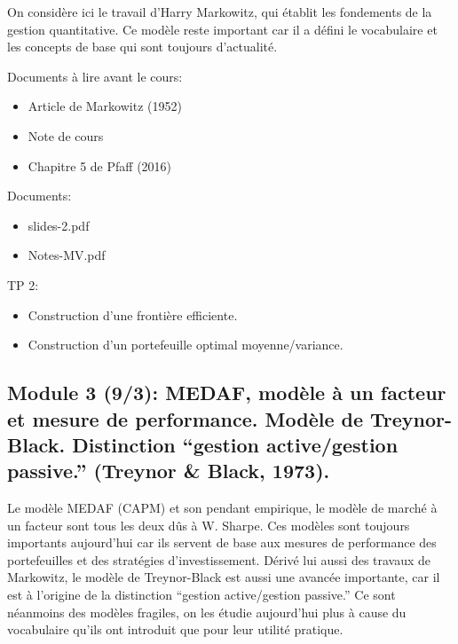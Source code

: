 \documentclass[
  11pt,
]{article}
\providecommand{\tightlist}{%
  \setlength{\itemsep}{0pt}\setlength{\parskip}{0pt}}
\begin{document}
On considère ici le travail d'Harry Markowitz, qui établit les
fondements de la gestion quantitative. Ce modèle reste important car il
a défini le vocabulaire et les concepts de base qui sont toujours
d'actualité.

Documents à lire avant le cours:

\begin{itemize}
\tightlist
\item
  Article de Markowitz (1952)
\item
  Note de cours
\item
  Chapitre 5 de Pfaff (2016)
\end{itemize}

Documents:

\begin{itemize}
\tightlist
\item
  slides-2.pdf
\item
  Notes-MV.pdf
\end{itemize}

TP 2:

\begin{itemize}
\tightlist
\item
  Construction d'une frontière efficiente.
\item
  Construction d'un portefeuille optimal moyenne/variance.
\end{itemize}

\hypertarget{module-3-93-medaf-moduxe8le-uxe0-un-facteur-et-mesure-de-performance.-moduxe8le-de-treynor-black.-distinction-gestion-activegestion-passive.-treynor1973.}{%
\subsection{Module 3 (9/3): MEDAF, modèle à un facteur et mesure de
performance. Modèle de Treynor-Black. Distinction ``gestion
active/gestion passive.'' (Treynor \& Black,
1973).}\label{module-3-93-medaf-moduxe8le-uxe0-un-facteur-et-mesure-de-performance.-moduxe8le-de-treynor-black.-distinction-gestion-activegestion-passive.-treynor1973.}}

Le modèle MEDAF (CAPM) et son pendant empirique, le modèle de marché à
un facteur sont tous les deux dûs à W. Sharpe. Ces modèles sont toujours
importants aujourd'hui car ils servent de base aux mesures de
performance des portefeuilles et des stratégies d'investissement. Dérivé
lui aussi des travaux de Markowitz, le modèle de Treynor-Black est aussi
une avancée importante, car il est à l'origine de la distinction
``gestion active/gestion passive.'' Ce sont néanmoins des modèles
fragiles, on les étudie aujourd'hui plus à cause du vocabulaire qu'ils
ont introduit que pour leur utilité pratique.
\end{document}
